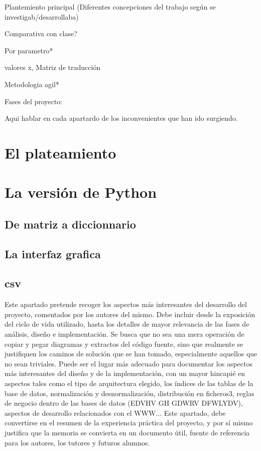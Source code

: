 
Plantemiento principal (Diferentes concepciones del trabajo según se investigab/desarrollaba)

Comparativa con clase?

Por parametro*

valores x, Matriz de traducción

Metodologia agil*

Fases del proyecto:

Aqui  hablar en cada apartardo de los inconvenientes que han ido surgiendo.
\section{El plateamiento}

\section{La versión de Python}

\subsection{De matriz a diccionnario}


\subsection{La interfaz grafica}



\subsection{csv}
Este apartado pretende recoger los aspectos más interesantes del desarrollo del proyecto, comentados por los autores del mismo.
Debe incluir desde la exposición del ciclo de vida utilizado, hasta los detalles de mayor relevancia de las fases de análisis, diseño e implementación.
Se busca que no sea una mera operación de copiar y pegar diagramas y extractos del código fuente, sino que realmente se justifiquen los caminos de solución que se han tomado, especialmente aquellos que no sean triviales.
Puede ser el lugar más adecuado para documentar los aspectos más interesantes del diseño y de la implementación, con un mayor hincapié en aspectos tales como el tipo de arquitectura elegido, los índices de las tablas de la base de datos, normalización y desnormalización, distribución en ficheros3, reglas de negocio dentro de las bases de datos (EDVHV GH GDWRV DFWLYDV), aspectos de desarrollo relacionados con el WWW...
Este apartado, debe convertirse en el resumen de la experiencia práctica del proyecto, y por sí mismo justifica que la memoria se convierta en un documento útil, fuente de referencia para los autores, los tutores y futuros alumnos.
